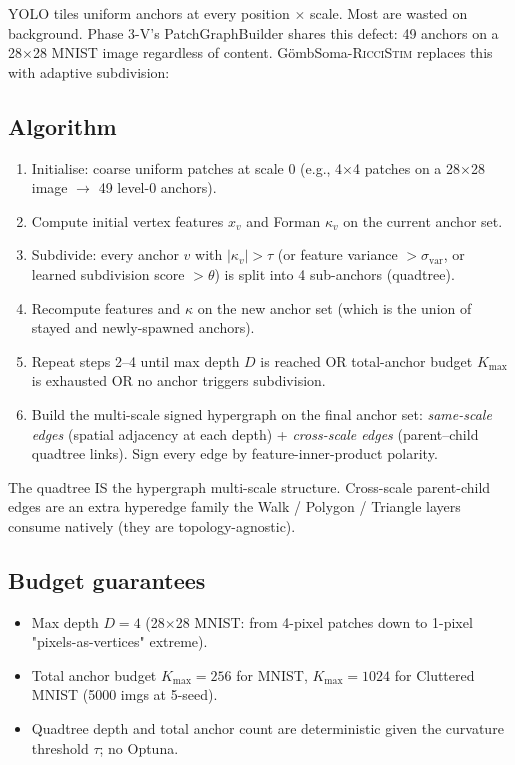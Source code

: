 \documentclass[11pt,a4paper]{article}
\newcommand{\Soma}{G\"ombSoma}
\newcommand{\RicciStim}{\Soma\textsc{-RicciStim}}
\begin{document}
YOLO tiles uniform anchors at every position $\times$ scale. Most are
wasted on background. Phase 3-V's PatchGraphBuilder shares this
defect: 49 anchors on a 28$\times$28 MNIST image regardless of
content. \RicciStim{} replaces this with adaptive subdivision:

\subsection{Algorithm}

\begin{enumerate}
\item Initialise: coarse uniform patches at scale 0 (e.g., 4$\times$4
  patches on a 28$\times$28 image $\to$ 49 level-0 anchors).
\item Compute initial vertex features $x_v$ and Forman $\kappa_v$
  on the current anchor set.
\item Subdivide: every anchor $v$ with $|\kappa_v| > \tau$ (or
  feature variance $> \sigma_\text{var}$, or learned subdivision
  score $> \theta$) is split into 4 sub-anchors (quadtree).
\item Recompute features and $\kappa$ on the new anchor set
  (which is the union of stayed and newly-spawned anchors).
\item Repeat steps 2--4 until max depth $D$ is reached OR
  total-anchor budget $K_\text{max}$ is exhausted OR no anchor
  triggers subdivision.
\item Build the multi-scale signed hypergraph on the final anchor set:
  \emph{same-scale edges} (spatial adjacency at each depth) +
  \emph{cross-scale edges} (parent--child quadtree links). Sign
  every edge by feature-inner-product polarity.
\end{enumerate}

The quadtree IS the hypergraph multi-scale structure. Cross-scale
parent-child edges are an extra hyperedge family the Walk / Polygon /
Triangle layers consume natively (they are topology-agnostic).

\subsection{Budget guarantees}

\begin{itemize}
\item Max depth $D = 4$ (28$\times$28 MNIST: from 4-pixel patches
  down to 1-pixel "pixels-as-vertices" extreme).
\item Total anchor budget $K_\text{max} = 256$ for MNIST,
  $K_\text{max} = 1024$ for Cluttered MNIST (5000 imgs at 5-seed).
\item Quadtree depth and total anchor count are deterministic
  given the curvature threshold $\tau$; no Optuna.
\end{itemize}
\end{document}
